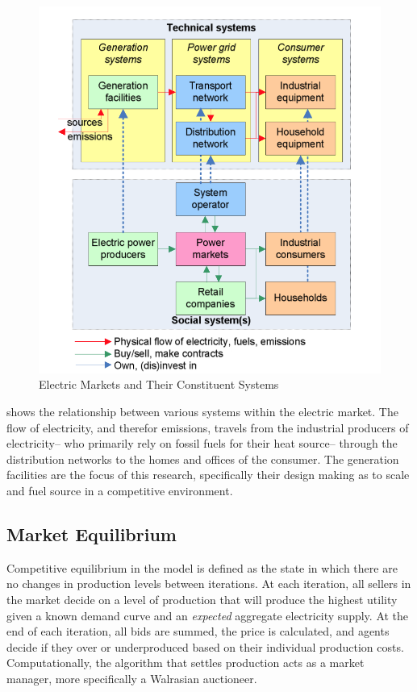 \documentclass[12pt]{article}
\begin{document}
\begin{figure}[H]
	\begin{center}
	\includegraphics[scale = .3]{cetMarket}
	\caption{Electric Markets and Their Constituent Systems \cite{flowfig}}
	\label{cetMarket}
	\end{center}
\end{figure}

 shows the relationship between various systems within the electric market. The flow of electricity, and therefor emissions, travels from the industrial producers of electricity-- who primarily rely on fossil fuels for their heat source-- through the distribution networks to the homes and offices of the consumer. The generation facilities are the focus of this research, specifically their design making as to scale and fuel source in a competitive environment. 

\subsection{Market Equilibrium}
Competitive equilibrium in the model is defined as the state in which there are no changes in production levels between iterations. At each iteration, all sellers in the market decide on a level of production that will produce the highest utility given a known demand curve and an \emph{expected} aggregate electricity supply. At the end of each iteration, all bids are summed, the price is calculated, and agents decide if they over or underproduced based on their individual production costs. Computationally, the algorithm that settles production acts as a market manager, more specifically a Walrasian auctioneer.\*
\end{document}
